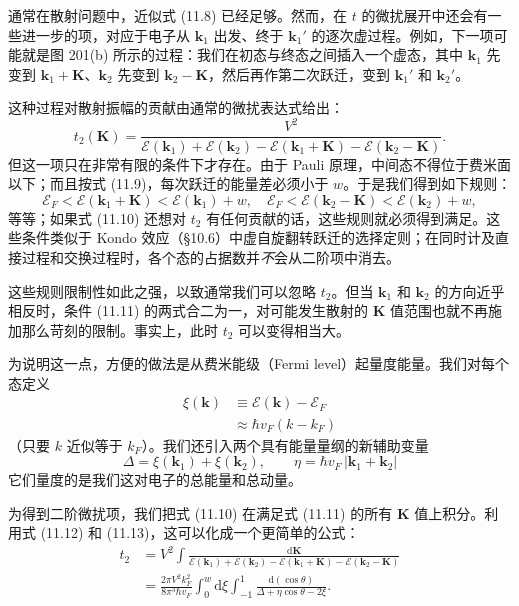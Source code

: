 通常在散射问题中，近似式 (11.8) 已经足够。然而，在 $t$ 的微扰展开中还会有一些进一步的项，对应于电子从 $\mathbf{k}_1$ 出发、终于 $\mathbf{k}_1'$ 的逐次虚过程。例如，下一项可能就是图 201(b) 所示的过程：我们在初态与终态之间插入一个虚态，其中 $\mathbf{k}_1$ 先变到 $\mathbf{k}_1+\mathbf{K}$、$\mathbf{k}_2$ 先变到 $\mathbf{k}_2-\mathbf{K}$，然后再作第二次跃迁，变到 $\mathbf{k}_1'$ 和 $\mathbf{k}_2'$。


这种过程对散射振幅的贡献由通常的微扰表达式给出：
\begin{equation*}
t_{2}(\mathbf{K})=\frac{V^{2}}{\mathcal{E}(\mathbf{k}_{1})+\mathcal{E}(\mathbf{k}_{2})-\mathcal{E}(\mathbf{k}_{1}+\mathbf{K})-\mathcal{E}(\mathbf{k}_{2}-\mathbf{K})}.
\tag{11.10}
\end{equation*}
但这一项只在非常有限的条件下才存在。由于 Pauli 原理，中间态不得位于费米面以下；而且按式 (11.9)，每次跃迁的能量差必须小于 $w$。于是我们得到如下规则：
\begin{equation*}
\mathcal{E}_{F}<\mathcal{E}(\mathbf{k}_{1}+\mathbf{K})<\mathcal{E}(\mathbf{k}_{1})+w,\quad
\mathcal{E}_{F}<\mathcal{E}(\mathbf{k}_{2}-\mathbf{K})<\mathcal{E}(\mathbf{k}_{2})+w,
\tag{11.11}
\end{equation*}
等等；如果式 (11.10) 还想对 $t_2$ 有任何贡献的话，这些规则就必须得到满足。这些条件类似于 Kondo 效应（§10.6）中虚自旋翻转跃迁的选择定则；在同时计及直接过程和交换过程时，各个态的占据数并\emph{不}会从二阶项中消去。

这些规则限制性如此之强，以致通常我们可以忽略 $t_2$。但当 $\mathbf{k}_1$ 和 $\mathbf{k}_2$ 的方向近乎相反时，条件 (11.11) 的两式合二为一，对可能发生散射的 $\mathbf{K}$ 值范围也就不再施加那么苛刻的限制。事实上，此时 $t_2$ 可以变得相当大。

为说明这一点，方便的做法是从费米能级（Fermi level）起量度能量。我们对每个态定义
\begin{align*}
\xi(\mathbf{k}) &\equiv \mathcal{E}(\mathbf{k})-\mathcal{E}_{F}\\
&\approx \hbar v_{F}(k-k_{F})
\tag{11.12}
\end{align*}
（只要 $k$ 近似等于 $k_F$）。我们还引入两个具有能量量纲的新辅助变量
\begin{equation*}
\Delta=\xi(\mathbf{k}_{1})+\xi(\mathbf{k}_{2}),\qquad
\eta=\hbar v_{F}\,|\mathbf{k}_{1}+\mathbf{k}_{2}|
\tag{11.13}
\end{equation*}
它们量度的是我们这对电子的总能量和总动量。

为得到二阶微扰项，我们把式 (11.10) 在满足式 (11.11) 的所有 $\mathbf{K}$ 值上积分。利用式 (11.12) 和 (11.13)，这可以化成一个更简单的公式：
\begin{align*}
t_{2} &= V^{2}\int \frac{\mathrm{d}\mathbf{K}}{\mathcal{E}(\mathbf{k}_{1})+\mathcal{E}(\mathbf{k}_{2})-\mathcal{E}(\mathbf{k}_{1}+\mathbf{K})-\mathcal{E}(\mathbf{k}_{2}-\mathbf{K})}\\
&= \frac{2\pi V^{2}k_{F}^{2}}{8\pi^{3}\hbar v_{F}}\int_{0}^{w}\mathrm{d}\xi\int_{-1}^{1}\frac{\mathrm{d}(\cos\theta)}{\Delta+\eta\cos\theta-2\xi}.
\tag{11.14}
\end{align*}

